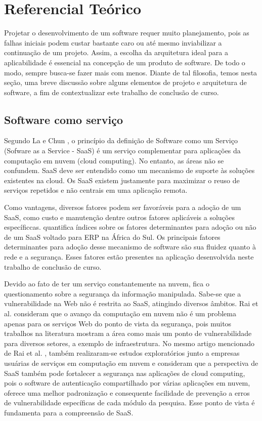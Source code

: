 \chapter{Referencial Teórico}


Projetar o desenvolvimento de um software requer muito planejamento, pois as falhas iniciais podem custar bastante caro ou até mesmo inviabilizar a continuação de um projeto. Assim, a escolha da arquitetura ideal para a aplicabilidade é essencial na concepção de um produto de software. 
De todo o modo, sempre busca-se fazer mais com menos. Diante de tal filosofia, temos nesta seção, uma breve discussão sobre alguns elementos de projeto e arquitetura de software, a fim de contextualizar este trabalho de conclusão de curso.


 \section{Software como serviço}\label{sec:saas}


Segundo La e Chun \citep{La2009Systematic}, o princípio da definição de Software como um Serviço (Sofware as a Service - SaaS) é um serviço complementar para aplicações da computação em nuvem (cloud computing). No entanto, as áreas não se confundem. SaaS deve ser entendido como um mecanismo de suporte às soluções existentes na cloud. Os SaaS existem justamente para maximizar o reuso de serviços repetidos e não centrais em uma aplicação remota.


Como vantagens, diversos fatores podem ser favoráveis para a adoção de um SaaS, como custo e manutenção dentre outros fatores aplicáveis a soluções específiccas. \cite{LechesaSS11} quantifica índices sobre os fatores determinantes para adoção ou não de um SaaS voltado para ERP na África do Sul. Os principais fatores determinantes para adoção desse mecanismo de software são sua fluidez quanto à rede e a segurança. Esses fatores estão presentes na aplicação desenvolvida neste trabalho de conclusão de curso.

 

Devido ao fato de ter um serviço constantemente na nuvem, fica o questionamento sobre a segurança da informação manipulada. Sabe-se que a vulnerabilidade na Web não é restrita ao SaaS, atingindo diversos âmbitos. Rai et al. \cite{journals/corr/RaiSM13} consideram que o avanço da computação em nuvem não é um problema apenas para os serviços Web do ponto de vista da segurança, pois muitos trabalhos na literatura mostram a área como mais um ponto de vulnerabilidade para diversos setores, a exemplo de infraestrutura. No mesmo artigo mencionado de Rai et al. \cite{journals/corr/RaiSM13}, também realizaram-se estudos exploratórios junto a empresas usuárias de serviços em computação em nuvem e consideram que a perspectiva de SaaS também pode fortalecer a segurança nas aplicações de cloud computing, pois o software de autenticação compartilhado por várias aplicações em nuvem, oferece uma melhor padronização e consequente facilidade de prevenção a erros de vulnerabilidade específicas de cada módulo da pesquisa. Esse ponto de vista é fundamenta para a compreensão de SaaS.


